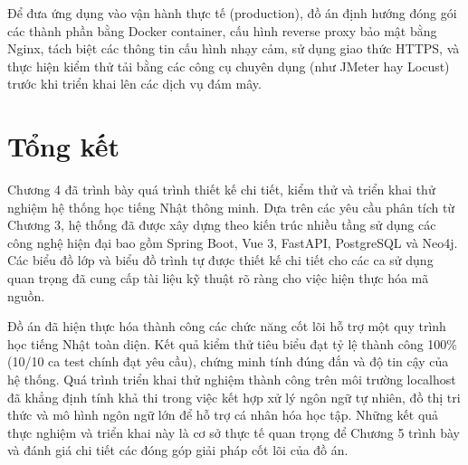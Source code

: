 \documentclass[../DoAn.tex]{subfiles}
\begin{document}
Để đưa ứng dụng vào vận hành thực tế (production), đồ án định hướng đóng gói các thành phần bằng Docker container, cấu hình reverse proxy bảo mật bằng Nginx, tách biệt các thông tin cấu hình nhạy cảm, sử dụng giao thức HTTPS, và thực hiện kiểm thử tải bằng các công cụ chuyên dụng (như JMeter hay Locust) trước khi triển khai lên các dịch vụ đám mây.

\section{Tổng kết}
\label{section:4.6}

Chương 4 đã trình bày quá trình thiết kế chi tiết, kiểm thử và triển khai thử nghiệm hệ thống học tiếng Nhật thông minh. Dựa trên các yêu cầu phân tích từ Chương 3, hệ thống đã được xây dựng theo kiến trúc nhiều tầng sử dụng các công nghệ hiện đại bao gồm Spring Boot, Vue 3, FastAPI, PostgreSQL và Neo4j. Các biểu đồ lớp và biểu đồ trình tự được thiết kế chi tiết cho các ca sử dụng quan trọng đã cung cấp tài liệu kỹ thuật rõ ràng cho việc hiện thực hóa mã nguồn.

Đồ án đã hiện thực hóa thành công các chức năng cốt lõi hỗ trợ một quy trình học tiếng Nhật toàn diện. Kết quả kiểm thử tiêu biểu đạt tỷ lệ thành công 100\% (10/10 ca test chính đạt yêu cầu), chứng minh tính đúng đắn và độ tin cậy của hệ thống. Quá trình triển khai thử nghiệm thành công trên môi trường localhost đã khẳng định tính khả thi trong việc kết hợp xử lý ngôn ngữ tự nhiên, đồ thị tri thức và mô hình ngôn ngữ lớn để hỗ trợ cá nhân hóa học tập. Những kết quả thực nghiệm và triển khai này là cơ sở thực tế quan trọng để Chương 5 trình bày và đánh giá chi tiết các đóng góp giải pháp cốt lõi của đồ án.
\end{document}
